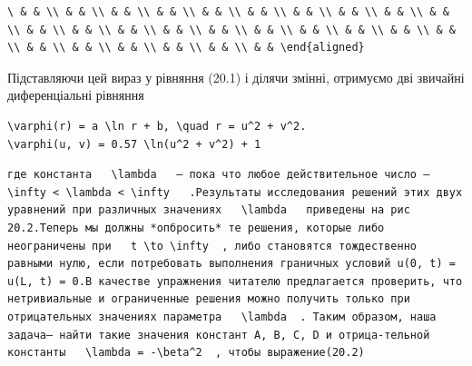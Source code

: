 \documentclass[
  ukrainian,
]{article}
\begin{document}
\begin{verbatim}
\ & & \\ & & \\ & & \\ & & \\ & & \\ & & \\ & & \\ & & \\ & & \\ & & \\ & & \\ & & \\ & & \\ & & \\ & & \\ & & \\ & & \\ & & \\ & & \\ & & \\ & & \\ & & \\ & & \\ & & \\ & & \\ & & \end{aligned}
\end{verbatim}

Підставляючи цей вираз у рівняння (20.1) і ділячи змінні, отримуємо дві
звичайні диференціальні рівняння

\begin{verbatim}
\varphi(r) = a \ln r + b, \quad r = u^2 + v^2.
\varphi(u, v) = 0.57 \ln(u^2 + v^2) + 1
\end{verbatim}

\begin{verbatim}
где константа   \lambda   — пока что любое действительное число —   \infty < \lambda < \infty   .Результаты исследования решений этих двух уравнений при различных значениях   \lambda   приведены на рис 20.2.Теперь мы должны *опбросить* те решения, которые либо неограничены при   t \to \infty  , либо становятся тождественно равными нулю, если потребовать выполнения граничных условий u(0, t) = u(L, t) = 0.В качестве упражнения читателю предлагается проверить, что нетривиальные и ограниченные решения можно получить только при отрицательных значениях параметра   \lambda  . Таким образом, наша задача— найти такие значения констант A, B, C, D и отрица-тельной константы   \lambda = -\beta^2  , чтобы выражение(20.2)
\end{verbatim}
\end{document}
